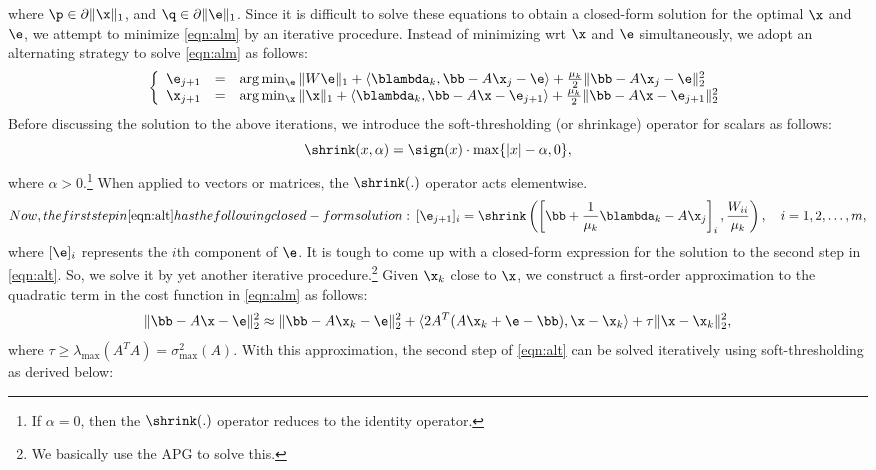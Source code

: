 where $\p \in \partial \|\x\|_1$, and $\q \in \partial \|\e\|_1$. Since it is difficult to solve these equations to obtain a closed-form solution for the optimal $\x$ and $\e$, we attempt to minimize \eqref{eqn:alm} by an iterative procedure. 
\smallbreak
Instead of minimizing wrt $\x$ and $\e$ simultaneously, we adopt an alternating strategy to solve \eqref{eqn:alm} as follows:
\begin{equation}
\left \{
\begin{array}{lll}
\e_{j+1} & = & \arg \min_{\e}  \|W\e\|_1 + \langle \blambda_k, \bb - A\x_j - \e \rangle + \frac{\mu_k}{2}\|\bb - A\x_j - \e\|_2^2 \\
\x_{j+1} & = & \arg \min_{\x} \|\x\|_1 + \langle \blambda_k, \bb - A\x - \e_{j+1} \rangle + \frac{\mu_k}{2}\|\bb - A\x - \e_{j+1}\|_2^2
\end{array}
\right .
\label{eqn:alt}
\end{equation}
Before discussing the solution to the above iterations, we introduce the soft-thresholding (or shrinkage) operator for scalars as follows:
\begin{equation}
\shrink(x,\alpha) = \sign(x)\cdot \max\{|x| - \alpha, 0\},
\end{equation}
where $\alpha > 0$.\footnote{If $\alpha = 0$, then the $\shrink(.)$ operator reduces to the identity operator.} When applied to vectors or matrices, the $\shrink(.)$ operator acts elementwise. 
\smallbreak
\begin{equation}
Now, the first step in \eqref{eqn:alt} has the following closed-form solution:
\,[\e_{j+1}]_i  =  \shrink \left(\left[ \bb + \frac{1}{\mu_k}\blambda_k - A\x_j \right] _i, \frac{W_{ii}}{\mu_k}\right), \quad i = 1,2,\ldots,m,
\end{equation}
where $[\e]_i$ represents the $i$th component of $\e$.
\smallbreak
It is tough to come up with a closed-form expression for the solution to the second step in \eqref{eqn:alt}. So, we solve it by yet another iterative procedure.\footnote{We basically use the APG to solve this.} Given $\x_k$ close to $\x$, we construct a first-order approximation to the quadratic term in the cost function in \eqref{eqn:alm} as follows:
\begin{equation}
\|\bb - A\x - \e\|_2^2 \approx \|\bb - A\x_k - \e\|_2^2 + \langle 2A^T(A\x_k+\e-\bb), \x - \x_k \rangle + \tau\|\x-\x_k\|_2^2,
\end{equation}
where $\tau \geq \lambda_\mathrm{max} (A^TA) = \sigma^2_\mathrm{max}(A)$. With this approximation, the second step of \eqref{eqn:alt} can be solved iteratively using soft-thresholding as derived below:
